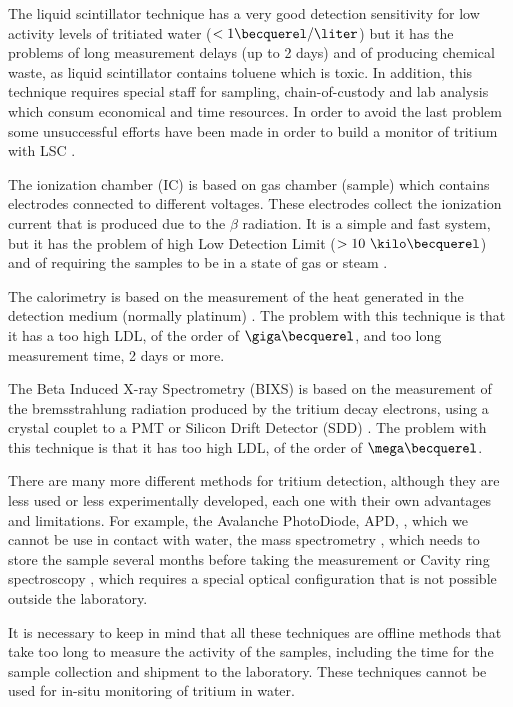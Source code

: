 The liquid scintillator technique has a very good detection sensitivity for low activity levels of tritiated water ($<1\becquerel/\liter$) \cite{0.6Bq_L} but it has the problems of long measurement delays (up to 2 days) and of producing chemical waste, as liquid scintillator contains toluene which is toxic. In addition, this technique requires special staff for sampling, chain-of-custody and lab analysis which consum economical and time resources. In order to avoid the last problem some unsuccessful efforts have been made in order to build a monitor of tritium with LSC \cite{OnlineLSC}. 

The ionization chamber (IC) is based on gas chamber (sample) which contains electrodes connected to different voltages. These electrodes collect the ionization current that is produced due to the $\beta$ radiation. It is a simple and fast system, but it has the problem of high Low Detection Limit ($> 10~\kilo\becquerel$) and of requiring the samples to be in a state of gas or steam \cite{IonizationChamber1, IonizationChamber2}.

The calorimetry is based on the measurement of the heat generated in the detection medium (normally platinum) \cite{Calorimeter1, Calorimeter2}. The problem with this technique is that it has a too high LDL, of the order of $\giga\becquerel$, and too long measurement time, 2 days or more.

The Beta Induced X-ray Spectrometry (BIXS) is based on the measurement of the bremsstrahlung radiation produced by the tritium decay electrons, using a  crystal couplet to a PMT  \cite{XRays1, XRays2} or Silicon Drift Detector (SDD) \cite{Bremstrahlung}. The problem with this technique is that it has too high LDL, of the order of $\mega\becquerel$.

There are many more different methods for tritium detection, although they are less used or less experimentally developed, each one with their own advantages and limitations. For example, the Avalanche PhotoDiode, APD, \cite{APD}, which we cannot be use in contact with water, the mass spectrometry \cite{Spectrometry}, which needs to store the sample several months before taking the measurement or Cavity ring spectroscopy \cite{Ring}, which requires a special optical configuration that is not possible outside the laboratory.

It is necessary to keep in mind that all these techniques are offline methods that take too long to measure the activity of the samples, including the time for the sample collection and shipment to the laboratory. These techniques cannot be used for in-situ monitoring of tritium in water.

